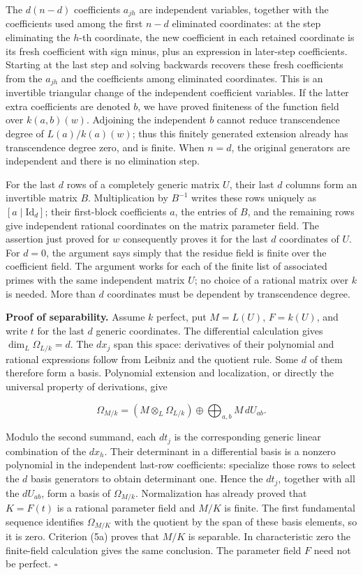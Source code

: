 \documentclass[
]{article}
\begin{document}
The \(d(n-d)\) coefficients \(a_{jh}\) are independent variables,
together with the coefficients used among the first \(n-d\) eliminated
coordinates: at the step eliminating the \(h\)-th coordinate, the new
coefficient in each retained coordinate is its fresh coefficient with
sign minus, plus an expression in later-step coefficients. Starting at
the last step and solving backwards recovers these fresh coefficients
from the \(a_{jh}\) and the coefficients among eliminated coordinates.
This is an invertible triangular change of the independent coefficient
variables. If the latter extra coefficients are denoted \(b\), we have
proved finiteness of the function field over \(k(a,b)(w)\). Adjoining
the independent \(b\) cannot reduce transcendence degree of
\(L(a)/k(a)(w)\); thus this finitely generated extension already has
transcendence degree zero, and is finite. When \(n=d\), the original
generators are independent and there is no elimination step.

For the last \(d\) rows of a completely generic matrix \(U\), their last
\(d\) columns form an invertible matrix \(B\). Multiplication by
\(B^{-1}\) writes these rows uniquely as \([a\mid\mathrm{Id}_d]\); their
first-block coefficients \(a\), the entries of \(B\), and the remaining
rows give independent rational coordinates on the matrix parameter
field. The assertion just proved for \(w\) consequently proves it for
the last \(d\) coordinates of \(U\). For \(d=0\), the argument says
simply that the residue field is finite over the coefficient field. The
argument works for each of the finite list of associated primes with the
same independent matrix \(U\); no choice of a rational matrix over \(k\)
is needed. More than \(d\) coordinates must be dependent by
transcendence degree.

\textbf{Proof of separability.} Assume \(k\) perfect, put \(M=L(U)\),
\(F=k(U)\), and write \(t\) for the last \(d\) generic coordinates. The
differential calculation gives \(\dim_L\Omega_{L/k}=d\). The \(dx_j\)
span this space: derivatives of their polynomial and rational
expressions follow from Leibniz and the quotient rule. Some \(d\) of
them therefore form a basis. Polynomial extension and localization, or
directly the universal property of derivations, give

\[
\Omega_{M/k}=(M\otimes_L\Omega_{L/k})
\oplus\bigoplus_{a,b}M\,dU_{ab}.
\]

Modulo the second summand, each \(dt_j\) is the corresponding generic
linear combination of the \(dx_h\). Their determinant in a differential
basis is a nonzero polynomial in the independent last-row coefficients:
specialize those rows to select the \(d\) basis generators to obtain
determinant one. Hence the \(dt_j\), together with all the \(dU_{ab}\),
form a basis of \(\Omega_{M/k}\). Normalization has already proved that
\(K=F(t)\) is a rational parameter field and \(M/K\) is finite. The
first fundamental sequence identifies \(\Omega_{M/K}\) with the quotient
by the span of these basis elements, so it is zero. Criterion (5a)
proves that \(M/K\) is separable. In characteristic zero the
finite-field calculation gives the same conclusion. The parameter field
\(F\) need not be perfect. \(\square\)
\end{document}
